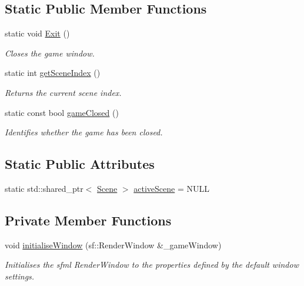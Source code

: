 \subsection*{Static Public Member Functions}
\begin{DoxyCompactItemize}
\item 
static void \hyperlink{class_game_manager_acbd9fb84f9e18c8cb585738d5c89a2b9}{Exit} ()
\begin{DoxyCompactList}\small\item\em Closes the game window. \end{DoxyCompactList}\item 
static int \hyperlink{class_game_manager_aa4835b5fc96bfdbf6170a8673baf5552}{get\+Scene\+Index} ()
\begin{DoxyCompactList}\small\item\em Returns the current scene index. \end{DoxyCompactList}\item 
static const bool \hyperlink{class_game_manager_a4eb94c6171bf3292eb57b291e2174289}{game\+Closed} ()
\begin{DoxyCompactList}\small\item\em Identifies whether the game has been closed. \end{DoxyCompactList}\end{DoxyCompactItemize}
\subsection*{Static Public Attributes}
\begin{DoxyCompactItemize}
\item 
static std\+::shared\+\_\+ptr$<$ \hyperlink{class_scene}{Scene} $>$ \hyperlink{class_game_manager_a969dd909c6b70310843d34e2490736b4}{active\+Scene} = N\+U\+LL
\end{DoxyCompactItemize}
\subsection*{Private Member Functions}
\begin{DoxyCompactItemize}
\item 
void \hyperlink{class_game_manager_a0a4c03ef0451371a98204c18c1faf9fd}{initialise\+Window} (sf\+::\+Render\+Window \&\+\_\+game\+Window)
\begin{DoxyCompactList}\small\item\em Initialises the sfml Render\+Window to the properties defined by the default window settings. \end{DoxyCompactList}\end{DoxyCompactItemize}

